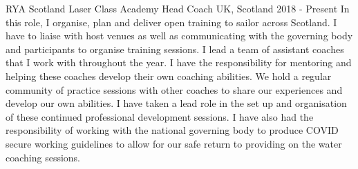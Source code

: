   \cventry
    {RYA Scotland} %
    {Laser Class Academy Head Coach} %
    {UK, Scotland} %
    {2018 - Present} %
    {
        In this role, I organise, plan and deliver open training to sailor across Scotland. I have to liaise with host venues as well as communicating with the governing body and participants to organise training sessions. I lead a team of assistant coaches that I work with throughout the year. I have the responsibility for mentoring and helping these coaches develop their own coaching abilities. We hold a regular community of practice sessions with other coaches to share our experiences and develop our own abilities. I have taken a lead role in the set up and organisation of these continued professional development sessions.\newline
        I have also had the responsibility of working with the national governing body to produce COVID secure working guidelines to allow for our safe return to providing on the water coaching sessions.\newline
    }
